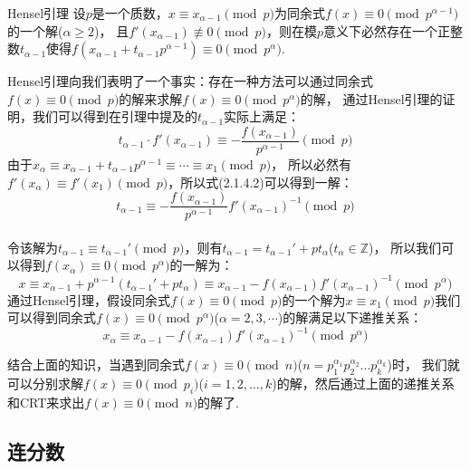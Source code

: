 \documentclass{book}
\numberwithin{equation}{subsubsection}
\begin{document}
\begin{concept}{Hensel引理}
设$p$是一个质数，$x\equiv x_{\alpha-1}\pmod{p}$为同余式$f(x)\equiv 0\pmod{p^{\alpha-1}}$的一个解($\alpha\ge 2$)，
且$f'(x_{\alpha-1})\not\equiv 0\pmod{p}$，则在模$p$意义下必然存在一个正整数$t_{\alpha-1}$使得$f(x_{\alpha-1}+t_{\alpha-1}p^{\alpha-1})\equiv 0\pmod{p^\alpha}$.\par
\end{concept}

Hensel引理向我们表明了一个事实：存在一种方法可以通过同余式$f(x)\equiv 0\pmod{p}$的解来求解$f(x)\equiv 0\pmod{p^\alpha}$的解，
通过Hensel引理的证明，我们可以得到在引理中提及的$t_{\alpha-1}$实际上满足：
\begin{equation}
    t_{\alpha-1}\cdot f'(x_{\alpha-1})\equiv -\frac{f(x_{\alpha-1})}{p^{\alpha-1}}\pmod{p}
\end{equation}
由于$x_{\alpha}\equiv x_{\alpha-1} + t_{\alpha-1}p^{\alpha-1}\equiv\cdots\equiv x_1\pmod{p}$，
所以必然有$f'(x_{\alpha})\equiv f'(x_1)\pmod{p}$，所以式(2.1.4.2)可以得到一解：
\begin{equation}
    t_{\alpha-1}\equiv -\frac{f(x_{\alpha-1})}{p^{\alpha-1}}f'(x_{\alpha-1})^{-1}\pmod{p}
    \nonumber
\end{equation}\\
令该解为$t_{\alpha-1}\equiv t_{\alpha-1}' \pmod{p}$，则有$t_{\alpha-1}=t_{\alpha-1}'+pt_{\alpha}$($t_{\alpha}\in\mathbb{Z}$)，
所以我们可以得到$f(x_{\alpha})\equiv 0\pmod{p^\alpha}$的一解为：
\begin{equation}
    x\equiv x_{\alpha-1}+p^{\alpha-1}(t_{\alpha-1}'+pt_{\alpha})\equiv x_{\alpha-1}-f(x_{\alpha-1})f'(x_{\alpha-1})^{-1}\pmod{p^\alpha}
    \nonumber
\end{equation}
通过Hensel引理，假设同余式$f(x)\equiv 0\pmod{p}$的一个解为$x\equiv x_1\pmod{p}$我们可以得到同余式$f(x)\equiv 0\pmod{p^\alpha}$($\alpha=2,3,\cdots$)的解满足以下递推关系：
\begin{equation}
    x_{\alpha} \equiv x_{\alpha-1}-f(x_{\alpha-1})f'(x_{\alpha-1})^{-1}\pmod{p^\alpha}
    \nonumber
\end{equation}\par
结合上面的知识，当遇到同余式$f(x)\equiv 0\pmod{n}$($n=p_1^{\alpha_1}p_2^{\alpha_2}\ldots p_k^{\alpha_k}$)时，
我们就可以分别求解$f(x)\equiv 0\pmod{p_i}$($i=1,2,\ldots,k$)的解，然后通过上面的递推关系和CRT来求出$f(x)\equiv 0\pmod{n}$的解了.\par

\subsection{连分数}
\end{document}

